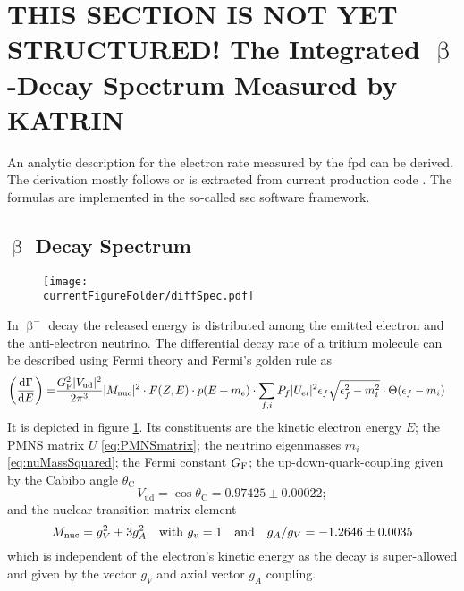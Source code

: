 \def\currentRootFolder{chapter/katrinExperiment/modelOfIntegratedRate}
\def\currentFigureFolder{\currentRootFolder/fig}


\section{THIS SECTION IS NOT YET STRUCTURED! The Integrated \texorpdfstring{$\upbeta$}{Beta}-Decay Spectrum Measured by KATRIN}
\label{sec:katrinExpIntSpecModel}
An analytic description for the electron rate measured by the \gls{fpd} can be derived. The derivation mostly follows \cite{Kleesiek2019, Groh2015, Kleesiek2014} or is extracted from current production code \cite{KATRINCOL2019}. The formulas are implemented in the so-called \gls{ssc} software framework.

\subsection{\texorpdfstring{$\upbeta$}{Beta} Decay Spectrum}
\begin{figure}
    \centering
    \texttt{[image: \\currentFigureFolder/diffSpec.pdf]}
    \label{fig:diffSpec}
\end{figure}
\label{sec:diffSpec}
In $\upbeta^-$ decay the released energy is distributed among the emitted electron and the anti-electron neutrino. The differential decay rate of a tritium molecule can be described using Fermi theory and Fermi's golden rule as
\begin{align}
    \label{eq:diffRate}
    \left(\frac{\mathop{}\!\mathrm{d}\Gamma}{\mathop{}\!\mathrm{d} E}\right) = &
    \frac{G_\mathrm{F}^2 \lvert V_\mathrm{ud}\rvert^2}{2 \pi^3}
    \lvert M_\mathrm{nuc}\rvert^2 \cdot
    F(Z, E) \cdot 
    p(E+m_{\mathrm{e}}) \cdot 
    \sum_{f,i} P_f \lvert U_{\mathrm{e} i}\rvert^2 \epsilon_f \sqrt{\epsilon_f^2-m_i^2} \cdot \Theta(\epsilon_f-m_i)
\end{align}
It is depicted in figure \ref{fig:diffSpec}. Its constituents are the kinetic electron energy $E$;
the PMNS matrix $U$ \eqref{eq:PMNSmatrix}; the neutrino eigenmasses $m_i$ \eqref{eq:nuMassSquared};
the Fermi constant $G_\mathrm{F}$;
the up-down-quark-coupling given by the Cabibo angle $\theta_\mathrm{C}$
\begin{equation}
    V_\mathrm{ud} = \cos \theta_\mathrm{C} = 
    0.97425\pm0.00022;
\end{equation}
and the nuclear transition matrix element
\begin{equation}
    M_\mathrm{nuc} = g_V^2+3g_A^2 \quad
    \text{with } g_v = 1 \quad
    \text{and} \quad g_A/g_V = -1.2646 \pm 0.0035
\end{equation}
which is independent of the electron's kinetic energy as the decay is super-allowed and given by the vector $g_V$ and axial vector $g_A$ coupling.

